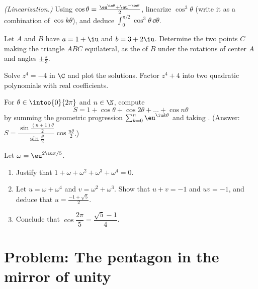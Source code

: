 \begin{exercise}[$\star\star$]\label{exo:g12:complex:6}
\emph{(Linearization.)} Using
$\cos\theta = \frac{\eu^{\iu\theta} + \eu^{-\iu\theta}}{2}$, linearize
$\cos^3\theta$ (write it as a combination of $\cos k\theta$), and deduce
$\displaystyle\int_0^{\pi/2}\cos^3\theta\,\dd\theta$.
\end{exercise}

\begin{exercise}[$\star\star$]\label{exo:g12:complex:7}
Let $A$ and $B$ have  $a = 1 + \iu$ and $b = 3 + 2\iu$. Determine the
two points $C$ making the triangle $ABC$ equilateral, as the  of $B$
under the rotations of center $A$ and angles $\pm\frac{\pi}{3}$.
\end{exercise}

\begin{exercise}[$\star\star\star$]\label{exo:g12:complex:8}
Solve $z^4 = -4$ in $\C$ and plot the solutions. Factor
$z^4 + 4$ into two quadratic polynomials with real coefficients.
\end{exercise}

\begin{exercise}[$\star\star\star$]\label{exo:g12:complex:9}
For $\theta \in \intoo{0}{2\pi}$ and $n \in \N$, compute
\[
S = 1 + \cos\theta + \cos 2\theta + \dots + \cos n\theta
\]
by summing the geometric progression
$\sum_{k=0}^n \eu^{\iu k\theta}$ and taking . (Answer:
$S = \dfrac{\sin\frac{(n+1)\theta}{2}}{\sin\frac{\theta}{2}}
\cos\frac{n\theta}{2}$.)
\end{exercise}

\begin{exercise}[$\star\star\star$]\label{exo:g12:complex:10}
Let $\omega = \eu^{2\iu\pi/5}$.
\begin{enumerate}
  \item Justify that $1 + \omega + \omega^2 + \omega^3 + \omega^4 = 0$.
  \item Let $u = \omega + \omega^4$ and $v = \omega^2 + \omega^3$. Show that
        $u + v = -1$ and $uv = -1$, and deduce that $u = \frac{-1+\sqrt5}{2}$.
  \item Conclude that $\cos\dfrac{2\pi}{5} = \dfrac{\sqrt5 - 1}{4}$.
\end{enumerate}
\end{exercise}

\section{Problem: The pentagon in the mirror of unity}

